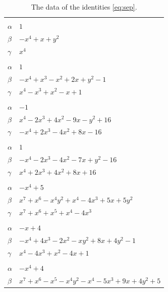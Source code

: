 \documentclass[11pt]{article}
\begin{document}
\begingroup\footnotesize
\setlength{\LTcapwidth}{\textwidth}
\begin{longtable}{@{}ll@{}}
\caption{The data of the identities \eqref{eq:sep}.}\label{tab:sep}\\
\hline\endfirsthead\hline\endhead\hline\endfoot
\multicolumn{2}{@{}l}{$\{i,j\}=\{0,1\}$, $k_{ij}=2^{2}$}\\
$\alpha$ & $1$\\
$\beta$ & $-x^{4}+x+y^{2}$\\
$\gamma$ & $x^{4}$\\
\addlinespace[3pt]
\multicolumn{2}{@{}l}{$\{i,j\}=\{0,6\}$, $k_{ij}=3$}\\
$\alpha$ & $1$\\
$\beta$ & $-x^{4}+x^{3}-x^{2}+2x+y^{2}-1$\\
$\gamma$ & $x^{4}-x^{3}+x^{2}-x+1$\\
\addlinespace[3pt]
\multicolumn{2}{@{}l}{$\{i,j\}=\{0,14\}$, $k_{ij}=2^{2}\cdot 7$}\\
$\alpha$ & $-1$\\
$\beta$ & $x^{4}-2x^{3}+4x^{2}-9x-y^{2}+16$\\
$\gamma$ & $-x^{4}+2x^{3}-4x^{2}+8x-16$\\
\addlinespace[3pt]
\multicolumn{2}{@{}l}{$\{i,j\}=\{0,15\}$, $k_{ij}=2^{2}\cdot 3^{2}$}\\
$\alpha$ & $1$\\
$\beta$ & $-x^{4}-2x^{3}-4x^{2}-7x+y^{2}-16$\\
$\gamma$ & $x^{4}+2x^{3}+4x^{2}+8x+16$\\
\addlinespace[3pt]
\multicolumn{2}{@{}l}{$\{i,j\}=\{0,18\}$, $k_{ij}=2^{2}\cdot 5$}\\
$\alpha$ & $-x^{4}+5$\\
$\beta$ & $x^{7}+x^{6}-x^{4}y^{2}+x^{4}-4x^{3}+5x+5y^{2}$\\
$\gamma$ & $x^{7}+x^{6}+x^{5}+x^{4}-4x^{3}$\\
\addlinespace[3pt]
\multicolumn{2}{@{}l}{$\{i,j\}=\{0,23\}$, $k_{ij}=3\cdot 5$}\\
$\alpha$ & $-x+4$\\
$\beta$ & $-x^{4}+4x^{3}-2x^{2}-xy^{2}+8x+4y^{2}-1$\\
$\gamma$ & $x^{4}-4x^{3}+x^{2}-4x+1$\\
\addlinespace[3pt]
\multicolumn{2}{@{}l}{$\{i,j\}=\{0,26\}$, $k_{ij}=3\cdot 7$}\\
$\alpha$ & $-x^{4}+4$\\
$\beta$ & $x^{7}+x^{6}-x^{5}-x^{4}y^{2}-x^{4}-5x^{3}+9x+4y^{2}+5$\\

\end{longtable}
\end{document}
